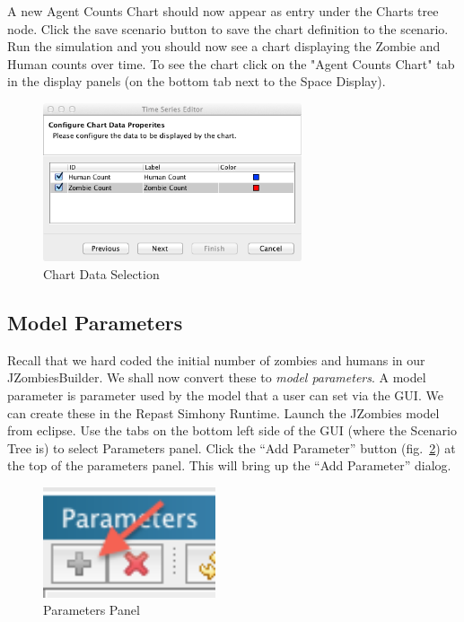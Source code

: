 \documentclass[11pt]{amsart}
\begin{document}
A new Agent Counts Chart should now appear as entry under the Charts tree node. Click the save scenario button to save the chart definition to the scenario. Run the simulation and you should now see a chart displaying the Zombie and Human counts over time. To see the chart click on the "Agent Counts Chart" tab in the display panels (on the bottom tab next to the Space Display).

\begin{figure}[h]
\begin{center}
\vspace{.2in}
\centerline {
\includegraphics[width=3in]{GettingStartedImages/chart_data.png}
}
\caption{Chart Data Selection}
\label{fig:chart1}
\end{center}
\end{figure}


\subsection{Model Parameters}
Recall that we hard coded the initial number of zombies and humans in our JZombiesBuilder. We shall now convert these to \textit{model parameters}. A model parameter is parameter used by the model that a user can set via the GUI. We can create these in the Repast Simhony Runtime. Launch the JZombies model from eclipse. Use the tabs on the bottom left side of the GUI (where the Scenario Tree is) to select Parameters panel. Click the ``Add Parameter''  button (fig.~\ref{fig:params1}) at the top of the parameters panel. This will bring up the ``Add Parameter'' dialog.

\begin{figure}[h]
\begin{center}
\vspace{.2in}
\centerline {
\includegraphics[width=2in]{GettingStartedImages/params1.png}
}
\caption{Parameters Panel}
\label{fig:params1}
\end{center}
\end{figure}
\end{document}
